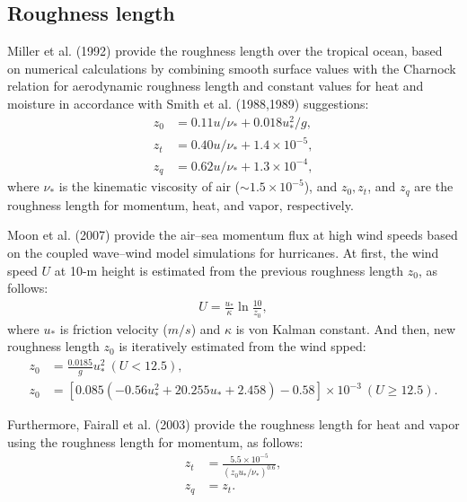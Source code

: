 \subsection{Roughness length}
Miller et al. (1992) provide the roughness length over the tropical ocean,
based on numerical calculations by combining smooth surface values
with the Charnock relation for aerodynamic roughness length
and constant values for heat and moisture in accordance with Smith et al. (1988,1989) suggestions:
\begin{align}
  z_0 &= 0.11u/\nu_* + 0.018u_*^2/g, \label{eq: z_0} \\
  z_t &= 0.40u/\nu_* + 1.4 \times 10^{-5}, \label{eq: z_t} \\
  z_q &= 0.62u/\nu_* + 1.3 \times 10^{-4}, \label{eq: z_q}
\end{align}
where $\nu_*$ is the kinematic viscosity of air ($\sim 1.5 \times 10^{-5}$), and $z_0, z_t$,
and $z_q$ are the roughness length for momentum, heat, and vapor, respectively.

Moon et al. (2007) provide the air--sea momentum flux at high wind speeds
based on the coupled wave--wind model simulations for hurricanes.
At first, the wind speed $U$ at 10-m height is estimated from the previous roughness length $z_0$, as follows:
\begin{align}
  U =\frac{u_{*}}{\kappa} \ln \frac{10}{z_0},
\end{align}
where
$u_{*}$ is friction velocity ($m/s$)
and $\kappa$ is von Kalman constant.
And then, new roughness length $z_0$ is iteratively estimated from the wind spped:
\begin{align}
  z_0 &= \frac{0.0185}{g} u_{*}^2 ~ ( U < 12.5 ), \\
  z_0 &= \left[ 0.085 \left( -0.56 u_{*}^2 + 20.255 u_{*} + 2.458 \right) - 0.58 \right] \times 10^{-3} ~ ( U \ge 12.5 ).
\end{align}

Furthermore, Fairall et al. (2003) provide the roughness length for heat and vapor
using the roughness length for momentum, as follows:
\begin{align}
  z_t &= \frac{ 5.5 \times 10^{-5} }{ ( z_0 u_{*} / \nu_{*} )^{0.6} }, \\
  z_q &= z_t.
\end{align}


